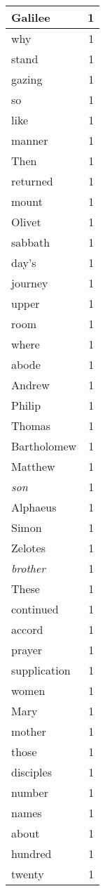 \begin{center}
\begin{longtable}{l|r}
Galilee & 1 \\ \hline
why & 1 \\ \hline
stand & 1 \\ \hline
gazing & 1 \\ \hline
so & 1 \\ \hline
like & 1 \\ \hline
manner & 1 \\ \hline
Then & 1 \\ \hline
returned & 1 \\ \hline
mount & 1 \\ \hline
Olivet & 1 \\ \hline
sabbath & 1 \\ \hline
day's & 1 \\ \hline
journey & 1 \\ \hline
upper & 1 \\ \hline
room & 1 \\ \hline
where & 1 \\ \hline
abode & 1 \\ \hline
Andrew & 1 \\ \hline
Philip & 1 \\ \hline
Thomas & 1 \\ \hline
Bartholomew & 1 \\ \hline
Matthew & 1 \\ \hline
\emph{son} & 1 \\ \hline
Alphaeus & 1 \\ \hline
Simon & 1 \\ \hline
Zelotes & 1 \\ \hline
\emph{brother} & 1 \\ \hline
These & 1 \\ \hline
continued & 1 \\ \hline
accord & 1 \\ \hline
prayer & 1 \\ \hline
supplication & 1 \\ \hline
women & 1 \\ \hline
Mary & 1 \\ \hline
mother & 1 \\ \hline
those & 1 \\ \hline
disciples & 1 \\ \hline
number & 1 \\ \hline
names & 1 \\ \hline
about & 1 \\ \hline
hundred & 1 \\ \hline
twenty & 1 \\ \hline

\end{longtable}
\end{center}
